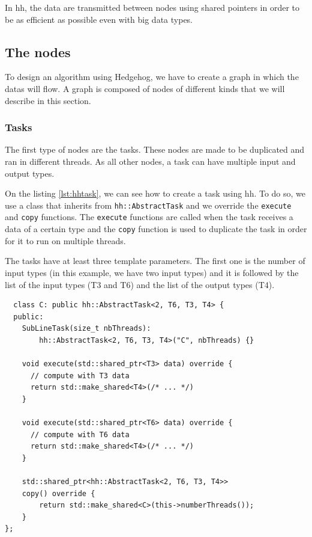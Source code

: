 In \gls{hh}, the data are transmitted between nodes using shared pointers in
order to be as efficient as possible even with big data types. %

\subsection{The nodes}

To design an algorithm using Hedgehog, we have to create a graph in which the
datas will flow. A graph is composed of nodes of different kinds that we will
describe in this section.

\subsubsection{Tasks}

The first type of nodes are the tasks. These nodes are made to be duplicated and
ran in different threads. As all other nodes, a task can have multiple input and
output types.

On the listing \ref{lst:hhtask}, we can see how to create a task using \gls{hh}.
To do so, we use a class that inherits from \texttt{hh::AbstractTask} and we
override the \texttt{execute} and \texttt{copy} functions. The
\texttt{execute} functions are called when the task receives a data of a certain
type and the \texttt{copy} function is used to duplicate the task in order for
it to run on multiple threads.

The tasks have at least three template parameters. The first one is the number
of input types (in this example, we have two input types) and it is followed by
the list of the input types (T3 and T6) and the list of the output types (T4).

\begin{verbatim}
  class C: public hh::AbstractTask<2, T6, T3, T4> {
  public:
    SubLineTask(size_t nbThreads):
        hh::AbstractTask<2, T6, T3, T4>("C", nbThreads) {}

    void execute(std::shared_ptr<T3> data) override {
      // compute with T3 data
      return std::make_shared<T4>(/* ... */)
    }

    void execute(std::shared_ptr<T6> data) override {
      // compute with T6 data
      return std::make_shared<T4>(/* ... */)
    }

    std::shared_ptr<hh::AbstractTask<2, T6, T3, T4>>
    copy() override {
        return std::make_shared<C>(this->numberThreads());
    }
};
\end{verbatim}
\label{lst:hhtask}

